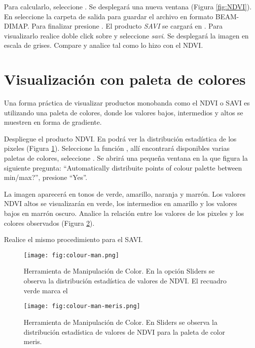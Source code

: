 Para calcularlo, seleccione .  Se desplegará una nueva ventana (Figura \ref{fig:NDVI}). En  seleccione la carpeta de salida para guardar el archivo en formato BEAM-DIMAP. Para finalizar presione . El producto \emph{SAVI} se cargará en . Para visualizarlo realice doble click sobre  y seleccione \emph{savi}. Se desplegará la imagen en escala de grises. Compare y analice tal como lo hizo con el NDVI.

\section{Visualización con paleta de colores}

Una forma práctica de visualizar productos monobanda como el NDVI o SAVI es utilizando una paleta de colores, donde los valores bajos, intermedios y altos se muestren en forma de gradiente.

Despliegue el producto NDVI. En  podrá ver la distribución estadística de los pixeles (Figura \ref{fig:color-man}). Seleccione la función , allí encontrará disponibles varias paletas de colores, seleccione . Se abrirá una pequeña ventana en la que figura la siguiente pregunta: ``Automatically distribuite points of colour palette between min/max?'', presione ``Yes''.

La imagen aparecerá en tonos de verde, amarillo, naranja y marrón. Los valores NDVI altos se visualizarán en verde, los intermedios en amarillo y los valores bajos en marrón oscuro. Analice la relación entre los valores de los pixeles y los colores observados (Figura \ref{fig:color-man-meris}).

Realice el mismo procedimiento para el SAVI.

\begin{figure}[h!]
    \centering
    \texttt{[image: fig:colour-man.png]}
    \caption{Herramienta de Manipulación de Color. En la opción Sliders se observa la distribución estadística de valores de NDVI. El recuadro verde marca el }
    \label{fig:color-man}
\end{figure}

\begin{figure}[h!]
    \centering
    \texttt{[image: fig:colour-man-meris.png]}
    \caption{Herramienta de Manipulación de Color. En Sliders se observa la distribución estadística de valores de NDVI para la paleta de color meris.}
    \label{fig:color-man-meris}
\end{figure}

